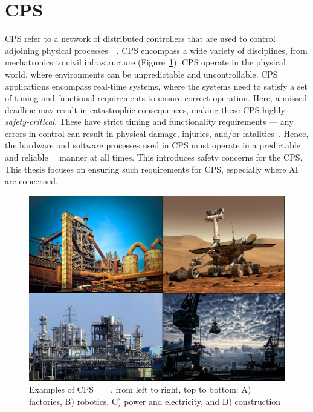 \section{\acf{CPS}}
\acf{CPS} refer to a network of distributed controllers that are used to control adjoining physical processes~\cite{alur2015principles}~\cite{CPSDesignChallenges}. 
\ac{CPS} encompass a wide variety of disciplines, from mechatronics to civil infrastructure (Figure~\ref{fig:cps}).
\ac{CPS} operate in the physical world, where environments can be unpredictable and uncontrollable.
\ac{CPS} applications encompass real-time systems, where the systems need to satisfy a set of timing and functional requirements to ensure correct operation. 
Here, a missed deadline may result in catastrophic consequences, making these \ac{CPS} highly \textit{safety-critical}. 
These have strict timing and functionality requirements --- any errors in control can result in physical damage, injuries, and/or fatalities~\cite{ANNDevModel1999}. 
Hence, the hardware and software processes used in \ac{CPS} must operate in a predictable and reliable~\cite{reliable-cps}~\cite{seshia2016towards} manner at all times.
This introduces safety concerns for the \ac{CPS}.
This thesis focuses on ensuring such requirements for \ac{CPS}, especially where \acf{AI} are concerned.

\begin{figure}[h]
	\centering
	\includegraphics[width=\textwidth]{Content/fig/1234.pdf}
	\caption{Examples of \ac{CPS}~\cite{industry-pic}~\cite{crane-pic}~\cite{rover-pic}~\cite{factory-pic}, from left to right, top to bottom: A) factories, B) robotics, C) power and electricity, and D) construction \label{fig:cps}}
\end{figure}

